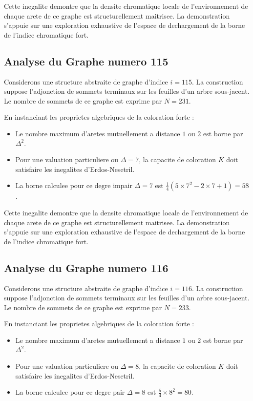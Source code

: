 \documentclass[11pt,a4paper]{article}
\begin{document}
Cette inegalite demontre que la densite chromatique locale de l'environnement de chaque arete de ce graphe est structurellement maitrisee. La demonstration s'appuie sur une exploration exhaustive de l'espace de dechargement de la borne de l'indice chromatique fort.

\subsection{Analyse du Graphe numero 115}
Considerons une structure abstraite de graphe d'indice $i = 115$. La construction suppose l'adjonction de sommets terminaux sur les feuilles d'un arbre sous-jacent. Le nombre de sommets de ce graphe est exprime par $N = 231$.

En instanciant les proprietes algebriques de la coloration forte :
\begin{itemize}
\item Le nombre maximum d'aretes mutuellement a distance $1$ ou $2$ est borne par $\Delta^2$.
\item Pour une valuation particuliere ou $\Delta = 7$, la capacite de coloration $K$ doit satisfaire les inegalites d'Erdos-Nesetril.
\item La borne calculee pour ce degre impair $\Delta = 7$ est $\frac{1}{4}(5 \times 7^2 - 2 \times 7 + 1) = 58$.
\end{itemize}

Cette inegalite demontre que la densite chromatique locale de l'environnement de chaque arete de ce graphe est structurellement maitrisee. La demonstration s'appuie sur une exploration exhaustive de l'espace de dechargement de la borne de l'indice chromatique fort.

\subsection{Analyse du Graphe numero 116}
Considerons une structure abstraite de graphe d'indice $i = 116$. La construction suppose l'adjonction de sommets terminaux sur les feuilles d'un arbre sous-jacent. Le nombre de sommets de ce graphe est exprime par $N = 233$.

En instanciant les proprietes algebriques de la coloration forte :
\begin{itemize}
\item Le nombre maximum d'aretes mutuellement a distance $1$ ou $2$ est borne par $\Delta^2$.
\item Pour une valuation particuliere ou $\Delta = 8$, la capacite de coloration $K$ doit satisfaire les inegalites d'Erdos-Nesetril.
\item La borne calculee pour ce degre pair $\Delta = 8$ est $\frac{5}{4} \times 8^2 = 80$.
\end{itemize}
\end{document}
